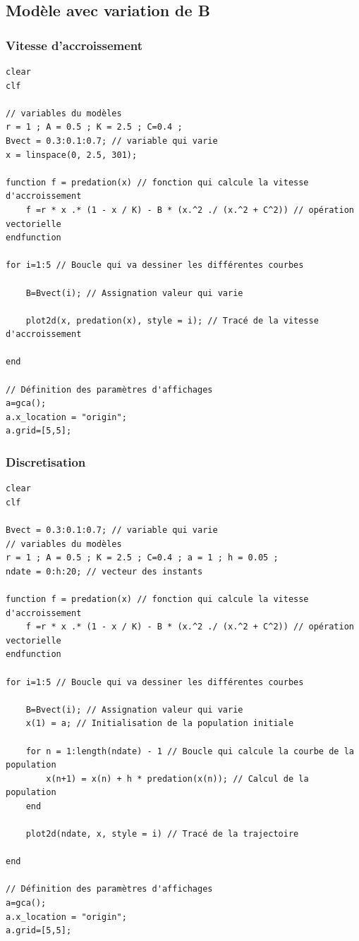 \documentclass{article}
\begin{document}
\subsection{Modèle avec variation de B}

\subsubsection{Vitesse d'accroissement}

\begin{verbatim}
clear
clf

// variables du modèles
r = 1 ; A = 0.5 ; K = 2.5 ; C=0.4 ;
Bvect = 0.3:0.1:0.7; // variable qui varie
x = linspace(0, 2.5, 301);

function f = predation(x) // fonction qui calcule la vitesse d'accroissement
    f =r * x .* (1 - x / K) - B * (x.^2 ./ (x.^2 + C^2)) // opération vectorielle
endfunction

for i=1:5 // Boucle qui va dessiner les différentes courbes

    B=Bvect(i); // Assignation valeur qui varie

    plot2d(x, predation(x), style = i); // Tracé de la vitesse d'accroissement

end

// Définition des paramètres d'affichages
a=gca();
a.x_location = "origin";
a.grid=[5,5];
\end{verbatim}

\subsubsection{Discretisation}

\begin{verbatim}
clear
clf

Bvect = 0.3:0.1:0.7; // variable qui varie
// variables du modèles
r = 1 ; A = 0.5 ; K = 2.5 ; C=0.4 ; a = 1 ; h = 0.05 ;
ndate = 0:h:20; // vecteur des instants

function f = predation(x) // fonction qui calcule la vitesse d'accroissement
    f =r * x .* (1 - x / K) - B * (x.^2 ./ (x.^2 + C^2)) // opération vectorielle
endfunction

for i=1:5 // Boucle qui va dessiner les différentes courbes
    
    B=Bvect(i); // Assignation valeur qui varie
    x(1) = a; // Initialisation de la population initiale
    
    for n = 1:length(ndate) - 1 // Boucle qui calcule la courbe de la population
        x(n+1) = x(n) + h * predation(x(n)); // Calcul de la population
    end
    
    plot2d(ndate, x, style = i) // Tracé de la trajectoire

end

// Définition des paramètres d'affichages
a=gca();
a.x_location = "origin";
a.grid=[5,5];
\end{verbatim}
\end{document}
